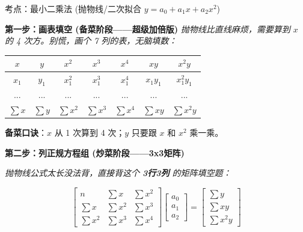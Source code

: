 \documentclass[12pt, a4paper]{article}
\begin{document}
\begin{knowpoint}{考点：最小二乘法 (抛物线/二次拟合 $y=a_0+a_1x+a_2x^2$)}

    \textbf{第一步：画表填空 (备菜阶段——超级加倍版)}
    \textit{抛物线比直线麻烦，需要算到 $x$ 的 4 次方。别慌，画个 7 列的表，无脑填数：}
    
    \begin{center}
    \small
    \begin{tabular}{|c|c|c|c|c|c|c|}
    \hline
    \textbf{$x$} & \textbf{$y$} & \textbf{$x^2$} & \textbf{$x^3$} & \textbf{$x^4$} & \textbf{$xy$} & \textbf{$x^2 y$} \\
    \hline
    $x_1$ & $y_1$ & $x_1^2$ & $x_1^3$ & $x_1^4$ & $x_1 y_1$ & $x_1^2 y_1$ \\
    ... & ... & ... & ... & ... & ... & ... \\
    \hline
    \textbf{$\sum x$} & \textbf{$\sum y$} & \textbf{$\sum x^2$} & \textbf{$\sum x^3$} & \textbf{$\sum x^4$} & \textbf{$\sum xy$} & \textbf{$\sum x^2 y$} \\
    \hline
    \end{tabular}
    \end{center}
    \vspace{0.5em}
    \textbf{备菜口诀}：$x$ 从 1 次算到 4 次；$y$ 只要跟 $x$ 和 $x^2$ 乘一乘。

    \vspace{1.0em}
    \textbf{第二步：列正规方程组 (炒菜阶段——3x3矩阵)}
    
    \textit{抛物线公式太长没法背，直接背这个 \textbf{3行3列} 的矩阵填空题：}
    
    \[
    \begin{bmatrix}
    n & \sum x & \sum x^2 \\
    \sum x & \sum x^2 & \sum x^3 \\
    \sum x^2 & \sum x^3 & \sum x^4
    \end{bmatrix}
    \begin{bmatrix} a_0 \\ a_1 \\ a_2 \end{bmatrix}
    =
    \begin{bmatrix} \sum y \\ \sum xy \\ \sum x^2 y \end{bmatrix}
    \]


\end{knowpoint}
\end{document}
